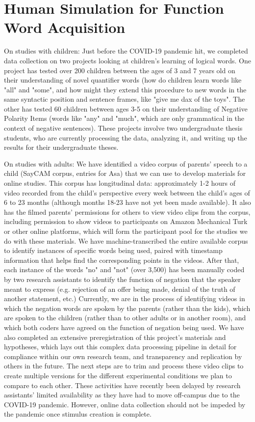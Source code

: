 \documentclass[11pt]{article}
\begin{document}
\section{Human Simulation for Function Word Acquisition} 
\label{sec:hsr}

On studies with children: Just before the COVID-19 pandemic hit, we completed data collection on two projects looking at children's learning of logical words. One project has tested over 200 children between the ages of 3 and 7 years old on their understanding of novel quantifier words (how do children learn words like "all" and "some", and how might they extend this procedure to new words in the same syntactic position and sentence frames, like "give me dax of the toys". The other has tested 60 children between ages 3-5 on their understanding of Negative Polarity Items (words like "any" and "much", which are only grammatical in the context of negative sentences). These projects involve two undergraduate thesis students, who are currently processing the data, analyzing it, and writing up the results for their undergraduate theses.

On studies with adults: We have identified a video corpus of parents' speech to a child (SayCAM corpus, entries for Asa) that we can use to develop materials for online studies. This corpus has longitudinal data: approximately 1-2 hours of video recorded from the child's perspective every week between the child's ages of 6 to 23 months (although months 18-23 have not yet been made available). It also has the filmed parents' permissions for others to view video clips from the corpus, including permission to show videos to participants on Amazon Mechanical Turk or other online platforms, which will form the participant pool for the studies we do with these materials. We have machine-transcribed the entire available corpus to identify instances of specific words being used, paired with timestamp information that helps find the corresponding points in the videos. After that, each instance of the words "no" and "not" (over 3,500) has been manually coded by two research assistants to identify the function of negation that the speaker meant to express (e.g. rejection of an offer being made, denial of the truth of another statement, etc.) Currently, we are in the process of identifying videos in which the negation words are spoken by the parents (rather than the kids), which are spoken to the children (rather than to other adults or in another room), and which both coders have agreed on the function of negation being used. We have also completed an extensive preregistration of this project's materials and hypotheses, which lays out this complex data processing pipeline in detail for compliance within our own research team, and transparency and replication by others in the future. The next steps are to trim and process these video clips to create multiple versions for the different experimental conditions we plan to compare to each other. These activities have recently been delayed by research assistants' limited availability as they have had to move off-campus due to the COVID-19 pandemic. However, online data collection should not be impeded by the pandemic once stimulus creation is complete.
 

 
 
\end{document}
